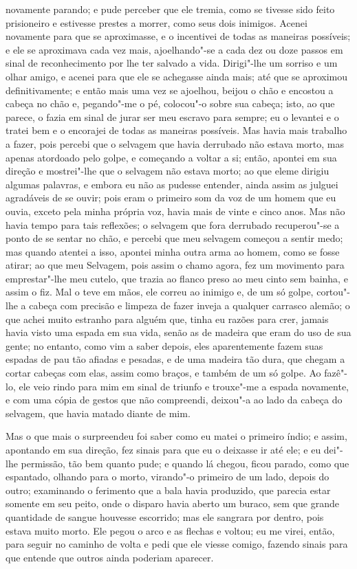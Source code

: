 novamente parando; e pude perceber que ele tremia, como se tivesse sido
feito prisioneiro e estivesse prestes a morrer, como seus dois inimigos.
Acenei novamente para que se aproximasse, e o incentivei de todas as
maneiras possíveis; e ele se aproximava cada vez mais, ajoelhando"-se a
cada dez ou doze passos em sinal de reconhecimento por lhe ter salvado a
vida. Dirigi"-lhe um sorriso e um olhar amigo, e acenei para que ele se
achegasse ainda mais; até que se aproximou definitivamente; e então mais
uma vez se ajoelhou, beijou o chão e encostou a cabeça no chão e,
pegando"-me o pé, colocou"-o sobre sua cabeça; isto, ao que parece, o
fazia em sinal de jurar ser meu escravo para sempre; eu o levantei e o
tratei bem e o encorajei de todas as maneiras possíveis. Mas havia mais
trabalho a fazer, pois percebi que o selvagem que havia derrubado não
estava morto, mas apenas atordoado pelo golpe, e começando a voltar a
si; então, apontei em sua direção e mostrei"-lhe que o selvagem não
estava morto; ao que eleme dirigiu algumas palavras, e embora eu não as
pudesse entender, ainda assim as julguei agradáveis de se ouvir; pois
eram o primeiro som da voz de um homem que eu ouvia, exceto pela minha
própria voz, havia mais de vinte e cinco anos. Mas não havia tempo para
tais reflexões; o selvagem que fora derrubado recuperou"-se a ponto de se
sentar no chão, e percebi que meu selvagem começou a sentir medo; mas
quando atentei a isso, apontei minha outra arma ao homem, como se fosse
atirar; ao que meu Selvagem, pois assim o chamo agora, fez um movimento
para emprestar"-lhe meu cutelo, que trazia ao flanco preso ao meu cinto
sem bainha, e assim o fiz. Mal o teve em mãos, ele correu ao inimigo e,
de um só golpe, cortou"-lhe a cabeça com precisão e limpeza de fazer
inveja a qualquer carrasco alemão; o que achei muito estranho para
alguém que, tinha eu razões para crer, jamais havia visto uma espada em
sua vida, senão as de madeira que eram do uso de sua gente; no entanto,
como vim a saber depois, eles aparentemente fazem suas espadas de pau
tão afiadas e pesadas, e de uma madeira tão dura, que chegam a cortar
cabeças com elas, assim como braços, e também de um só golpe. Ao
fazê"-lo, ele veio rindo para mim em sinal de triunfo e trouxe"-me a
espada novamente, e com uma cópia de gestos que não compreendi, deixou"-a
ao lado da cabeça do selvagem, que havia matado diante de mim.

Mas o que mais o surpreendeu foi saber como eu matei o primeiro índio; e
assim, apontando em sua direção, fez sinais para que eu o deixasse ir
até ele; e eu dei"-lhe permissão, tão bem quanto pude; e quando lá
chegou, ficou parado, como que espantado, olhando para o morto,
virando"-o primeiro de um lado, depois do outro; examinando o ferimento
que a bala havia produzido, que parecia estar somente em seu peito, onde
o disparo havia aberto um buraco, sem que grande quantidade de sangue
houvesse escorrido; mas ele sangrara por dentro, pois estava muito
morto. Ele pegou o arco e as flechas e voltou; eu me virei, então, para
seguir no caminho de volta e pedi que ele viesse comigo, fazendo sinais
para que entende que outros ainda poderiam aparecer.

